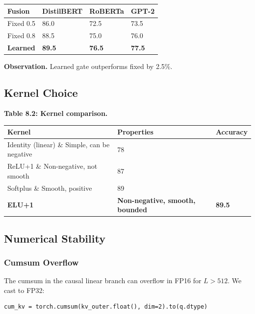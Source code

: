 \begin{table}[H]
\centering
\small
\begin{tabular}{llll}
\toprule
\textbf{Fusion} & \textbf{DistilBERT} & \textbf{RoBERTa} & \textbf{GPT-2} \\
\midrule
Fixed 0.5 & 86.0 & 72.5 & 73.5 \\
Fixed 0.8 & 88.5 & 75.0 & 76.0 \\
\textbf{Learned} & \textbf{89.5} & \textbf{76.5} & \textbf{77.5} \\
\bottomrule
\end{tabular}
\end{table}

\textbf{Observation.} Learned gate outperforms fixed by 2.5\%.

\subsection{Kernel Choice}

\textbf{Table 8.2: Kernel comparison.}

\begin{table}[H]
\centering
\small
\begin{tabular}{lll}
\toprule
\textbf{Kernel} & \textbf{Properties} & \textbf{Accuracy} \\
\midrule
Identity (linear) \& Simple, can be negative & 78 \\
ReLU+1 \& Non-negative, not smooth & 87 \\
Softplus \& Smooth, positive & 89 \\
\textbf{ELU+1} & \textbf{Non-negative, smooth, bounded} & \textbf{89.5} \\
\bottomrule
\end{tabular}
\end{table}

\subsection{Numerical Stability}

\subsubsection{Cumsum Overflow}

The cumsum in the causal linear branch can overflow in FP16 for $L > 512$. 
We cast to FP32:

\begin{lstlisting}
cum_kv = torch.cumsum(kv_outer.float(), dim=2).to(q.dtype)
\end{lstlisting}

